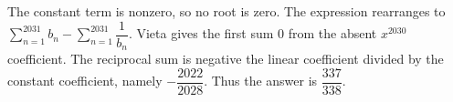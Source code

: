 The constant term is nonzero, so no root is zero. The expression rearranges to $\sum_{n=1}^{2031}b_n-\sum_{n=1}^{2031}\dfrac{1}{b_n}$. Vieta gives the first sum 0 from the absent $x^{2030}$ coefficient. The reciprocal sum is negative the linear coefficient divided by the constant coefficient, namely $-\dfrac{2022}{2028}$. Thus the answer is $\boxed{\dfrac{337}{338}}$.
